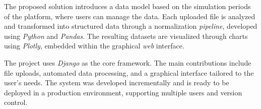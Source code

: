 The proposed solution introduces a data model based on the simulation periods of the platform, where users can manage the data. Each uploaded file is analyzed and transformed into structured data through a normalization \textit{pipeline}, developed using \textit{Python} and \textit{Pandas}. The resulting datasets are visualized through charts using \textit{Plotly}, embedded within the graphical \textit{web} interface.

The project uses \textit{Django} as the core framework. The main contributions include file uploads, automated data processing, and a graphical interface tailored to the user's needs. The system was developed incrementally and is ready to be deployed in a production environment, supporting multiple users and version control.